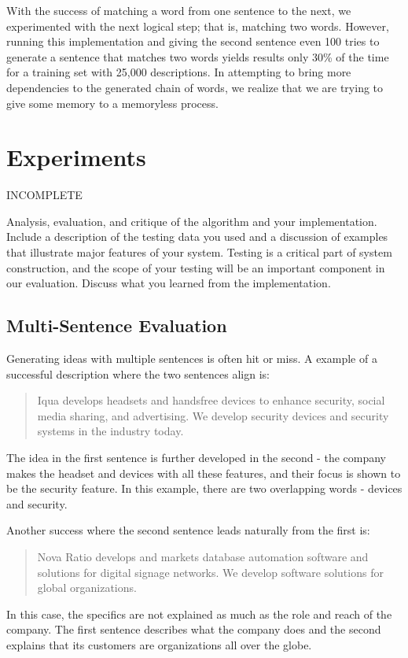 \documentclass[11pt]{article}
\begin{document}
With the success of matching a word from one sentence to the next, we experimented with the next logical step; that is, matching two words. However, running this implementation and giving the second sentence even 100 tries to generate a sentence that matches two words yields results only 30\% of the time for a training set with 25,000 descriptions. In attempting to bring more dependencies to the generated chain of words, we realize that we are trying to give some memory to a memoryless process.


\section{Experiments}
INCOMPLETE

Analysis, evaluation, and critique of the algorithm and your
implementation. Include a description of the testing data you used and
a discussion of examples that illustrate major features of your
system. Testing is a critical part of system construction, and the
scope of your testing will be an important component in our
evaluation. Discuss what you learned from the implementation.

\subsection{Multi-Sentence Evaluation}

Generating ideas with multiple sentences is often hit or miss. A example of a successful description where the two sentences align is: 
\begin{quote} 
Iqua develops headsets and handsfree devices to enhance security, social media sharing, and advertising. We develop security devices and security systems in the industry today.
\end{quote}
The idea in the first sentence is further developed in the second - the company makes the headset and devices with all these features, and their focus is shown to be the security feature. In this example, there are two overlapping words - devices and security. 

Another success where the second sentence leads naturally from the first is:
\begin{quote}
Nova Ratio develops and markets database automation software and solutions for digital signage networks. We develop software solutions for global organizations.
\end{quote}
In this case, the specifics are not explained as much as the role and reach of the company. The first sentence describes what the company does and the second explains that its customers are organizations all over the globe.
\end{document}
